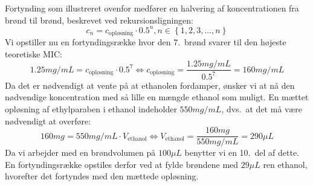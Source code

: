     Fortynding som illustreret ovenfor medfører en halvering af koncentrationen fra brønd til brønd, beskrevet ved rekursionsligningen:
    \[
        c_n=c_{\text{opløsning}}\cdot 0.5^n, n \in \left\{1,2,3,...,n\right\}
    \]
    Vi opstiller nu en fortyndingsrække hvor den 7.\ brønd svarer til den højeste teoretiske MIC:
    \[
        1.25\si{mg\per mL}=c_{\text{opløsning}}\cdot 0.5^7 \Leftrightarrow c_{\text{opløsning}}=\frac{1.25\si{mg\per mL}}{0.5^7}=160\si{mg\per mL}
    \]
    Da det er nødvendigt at vente på at ethanolen fordamper, ønsker vi at nå den nødvendige koncentration med så lille en mængde ethanol som muligt. En mættet opløsning af ethylparaben i ethanol indeholder $550\si{mg\per mL}$, dvs.\ at det må være nødvendigt at overføre:
    \[
        160\si{mg}=550\si{mg\per mL} \cdot V_{\text{ethanol}} \Leftrightarrow V_{\text{ethanol}}=\frac{160\si{mg}}{550\si{mg\per mL}}=290\si{\mu L}
    \]
    Da vi arbejder med en brøndvolumen på $100\si{\mu L}$ benytter vi en 10.\ del af dette. En fortyndingsrække opstiles derfor ved at fylde brøndene med $29\si{\mu L}$ ren ethanol, hvorefter det fortyndes med den mættede opløsning.

